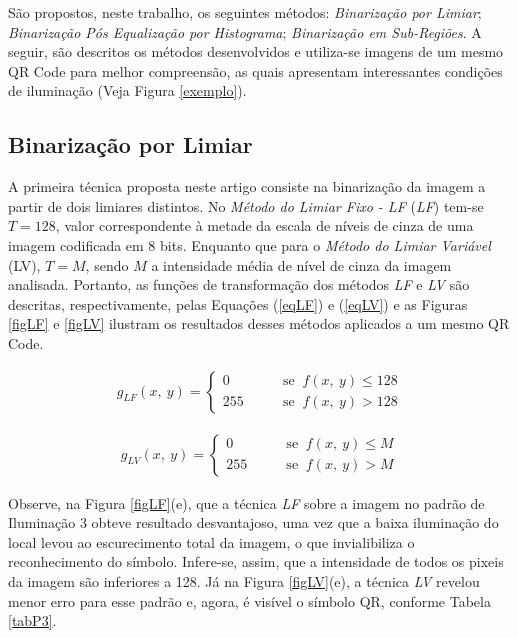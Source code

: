 \documentclass{ceel}
\begin{document}
\begin{multicols}{2}
São propostos, neste trabalho, os seguintes métodos: \emph{Binarização por Limiar}; \emph{Binarização Pós Equalização por Histograma}; \emph{Binarização em Sub-Regiões}. A seguir, são descritos os métodos desenvolvidos e utiliza-se imagens de um mesmo QR Code para melhor compreensão, as quais apresentam interessantes condições de iluminação (Veja Figura \ref{exemplo}).


\subsection{Binarização por Limiar} \label{Aconst}
A primeira técnica proposta neste artigo consiste na binarização da imagem a partir de dois limiares distintos. No \textit{Método do Limiar Fixo - LF} (\emph{LF}) tem-se 
$T=128$, valor correspondente à metade da escala de níveis de cinza de uma imagem codificada em 8 bits. Enquanto que para o \textit{Método do Limiar Variável} (LV), $T=M$,  sendo $M$ a intensidade média de nível de cinza da imagem analisada. Portanto, as funções de transformação dos métodos \textit{LF} e \textit{LV} são descritas, respectivamente, pelas Equações (\ref{eqLF}) e (\ref{eqLV}) e as Figuras \ref{figLF} e \ref{figLV} ilustram os resultados desses métodos aplicados a um mesmo QR Code.

\vspace{-0.01cm}
\begin{gather}
g_{LF}( x,\ y) =\begin{cases}
0 & \quad \quad \text{se }\ f( x,\ y) \leqslant 128\\
255 & \quad \quad \text{se }\ f( x,\ y)  >128
\end{cases}
\label{eqLF}
\end{gather}

\begin{gather}
g_{LV}( x,\ y) =\begin{cases}
0 & \quad \quad \text{se }\ f( x,\ y) \leqslant M\\
255 & \quad \quad \text{se }\ f( x,\ y)  >M
\end{cases}
\label{eqLV}
\end{gather}
\vspace{0.01cm}

Observe, na Figura \ref{figLF}(e), que a técnica \emph{LF} sobre a imagem no padrão de Iluminação 3 obteve resultado desvantajoso, uma vez que a baixa iluminação do local levou ao escurecimento total da imagem, o que invialibiliza o reconhecimento do símbolo. Infere-se, assim, que a intensidade de todos os pixeis da imagem são inferiores a 128. Já na Figura \ref{figLV}(e), a técnica \emph{LV} revelou menor erro para esse padrão e, agora, é visível o símbolo QR, conforme  Tabela \ref{tabP3}. 


\end{multicols}
\end{document}

